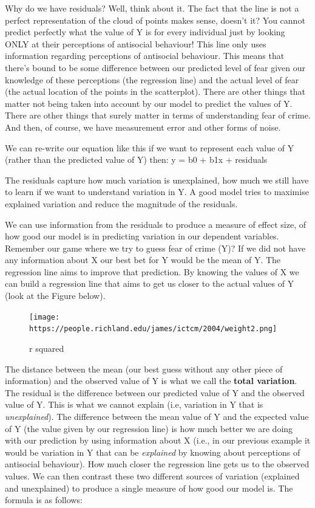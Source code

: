 \documentclass[]{book}
\theoremstyle{definition}
\theoremstyle{definition}
\theoremstyle{definition}
\theoremstyle{remark}
\begin{document}
Why do we have residuals? Well, think about it. The fact that the line
is not a perfect representation of the cloud of points makes sense,
doesn't it? You cannot predict perfectly what the value of Y is for
every individual just by looking ONLY at their perceptions of antisocial
behaviour! This line only uses information regarding perceptions of
antisocial behaviour. This means that there's bound to be some
difference between our predicted level of fear given our knowledge of
these perceptions (the regression line) and the actual level of fear
(the actual location of the points in the scatterplot). There are other
things that matter not being taken into account by our model to predict
the values of Y. There are other things that surely matter in terms of
understanding fear of crime. And then, of course, we have measurement
error and other forms of noise.

We can re-write our equation like this if we want to represent each
value of Y (rather than the predicted value of Y) then: y = b0 + b1x +
residuals

The residuals capture how much variation is unexplained, how much we
still have to learn if we want to understand variation in Y. A good
model tries to maximise explained variation and reduce the magnitude of
the residuals.

We can use information from the residuals to produce a measure of effect
size, of how good our model is in predicting variation in our dependent
variables. Remember our game where we try to guess fear of crime (Y)? If
we did not have any information about X our best bet for Y would be the
mean of Y. The regression line aims to improve that prediction. By
knowing the values of X we can build a regression line that aims to get
us closer to the actual values of Y (look at the Figure below).

\begin{figure}
\centering
\texttt{[image: https://people.richland.edu/james/ictcm/2004/weight2.png]}
\caption{r squared}
\end{figure}

The distance between the mean (our best guess without any other piece of
information) and the observed value of Y is what we call the
\textbf{total variation}. The residual is the difference between our
predicted value of Y and the observed value of Y. This is what we cannot
explain (i.e, variation in Y that is \emph{unexplained}). The difference
between the mean value of Y and the expected value of Y (the value given
by our regression line) is how much better we are doing with our
prediction by using information about X (i.e., in our previous example
it would be variation in Y that can be \emph{explained} by knowing about
perceptions of antisocial behaviour). How much closer the regression
line gets us to the observed values. We can then contrast these two
different sources of variation (explained and unexplained) to produce a
single measure of how good our model is. The formula is as follows:
\end{document}

